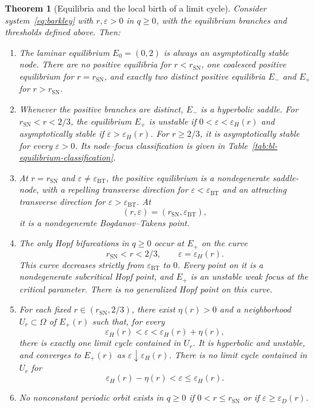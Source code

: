 \documentclass[11pt,reqno]{amsart}
\theoremstyle{plain}
\newtheorem{theorem}{Theorem}[section]
\theoremstyle{definition}
\theoremstyle{remark}
\begin{document}
\begin{theorem}[Equilibria and the local birth of a limit cycle]
\label{thm:bl-equilibria-cycles}
Consider system~\eqref{eq:barkley} with $r,\varepsilon>0$ in
$q\geq0$, with the equilibrium branches and thresholds defined
above. Then:
\begin{enumerate}
\item
The laminar equilibrium $E_0=(0,2)$ is always an asymptotically
stable node. There are no positive equilibria for
$r<r_{\mathrm{SN}}$, one coalesced positive equilibrium for
$r=r_{\mathrm{SN}}$, and exactly two distinct positive
equilibria $E_-$ and $E_+$ for $r>r_{\mathrm{SN}}$.

\item
Whenever the positive branches are distinct, $E_-$ is a
hyperbolic saddle. For $r_{\mathrm{SN}}<r<2/3$, the equilibrium
$E_+$ is unstable if
$0<\varepsilon<\varepsilon_H(r)$ and asymptotically stable if
$\varepsilon>\varepsilon_H(r)$. For $r\geq2/3$, it is
asymptotically stable for every $\varepsilon>0$.
Its node--focus classification is given in
Table~\ref{tab:bl-equilibrium-classification}.

\item
At $r=r_{\mathrm{SN}}$ and
$\varepsilon\neq\varepsilon_{\mathrm{BT}}$, the positive
equilibrium is a nondegenerate saddle-node, with a repelling
transverse direction for
$\varepsilon<\varepsilon_{\mathrm{BT}}$ and an attracting
transverse direction for
$\varepsilon>\varepsilon_{\mathrm{BT}}$. At
\[
(r,\varepsilon)
=
(r_{\mathrm{SN}},\varepsilon_{\mathrm{BT}}),
\]
it is a nondegenerate Bogdanov--Takens point.

\item
The only Hopf bifurcations in $q\geq0$ occur at $E_+$ on the
curve
\[
r_{\mathrm{SN}}<r<2/3,
\qquad
\varepsilon=\varepsilon_H(r).
\]
This curve decreases strictly from
$\varepsilon_{\mathrm{BT}}$ to $0$. Every point on it is a
nondegenerate subcritical Hopf point, and $E_+$ is an unstable
weak focus at the critical parameter. There is no generalized
Hopf point on this curve.

\item
For each fixed $r\in(r_{\mathrm{SN}},2/3)$, there exist
$\eta(r)>0$ and a neighborhood
$U_r\subset\Omega$ of $E_+(r)$ such that, for every
\[
\varepsilon_H(r)
<
\varepsilon
<
\varepsilon_H(r)+\eta(r),
\]
there is exactly one limit cycle contained in $U_r$.
It is hyperbolic and unstable, and converges to $E_+(r)$ as
$\varepsilon\downarrow\varepsilon_H(r)$.
There is no limit cycle contained in $U_r$ for
\[
\varepsilon_H(r)-\eta(r)
<
\varepsilon
\leq
\varepsilon_H(r).
\]

\item
No nonconstant periodic orbit exists in $q\geq0$ if
$0<r\leq r_{\mathrm{SN}}$ or if
$\varepsilon\geq\varepsilon_D(r)$.
\end{enumerate}
\end{theorem}
\end{document}
